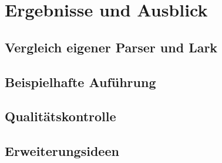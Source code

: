 \chapter{Ergebnisse und Ausblick}
\section{Vergleich eigener Parser und Lark}
\section{Beispielhafte Auführung}
\section{Qualitätskontrolle}
\section{Erweiterungsideen}
\lipsum
